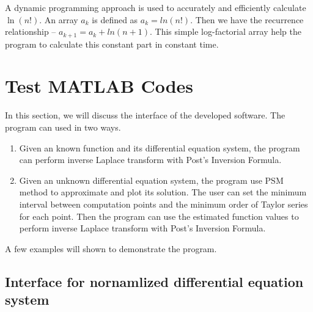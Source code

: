 \documentclass[12pt]{article}
\begin{document}
A dynamic programming approach is used to accurately and efficiently calculate $\ln(n!)$. An array $a_{k}$ is defined as $a_{k} = ln(n!)$. Then we have the recurrence relationship -- $a_{k+1} = a_{k} + ln(n+1)$. This simple log-factorial array help the program to calculate this constant part in constant time.


\section{Test MATLAB Codes}

In this section, we will discuss the interface of the developed software. The program can used in two ways.
\begin{enumerate}
\item Given an known function and its differential equation system, the program can perform inverse Laplace transform with Post's Inversion Formula.
\item Given an unknown differential equation system, the program use PSM method to approximate and plot its solution. The user can set the minimum interval between computation points and the minimum order of Taylor series for each point.
Then the program can use the estimated function values to perform inverse Laplace transform with Post's Inversion Formula.
\end{enumerate}
A few examples will shown to demonstrate the program.

\subsection{Interface for nornamlized differential equation system}
\end{document}

